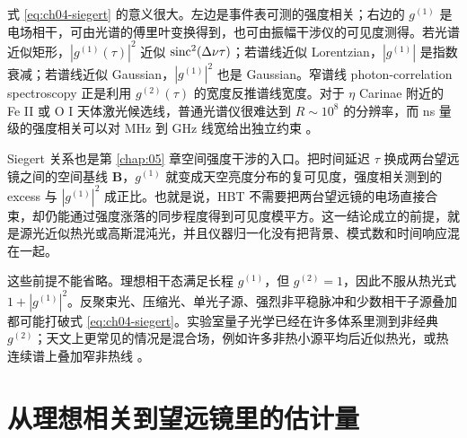 式 \eqref{eq:ch04-siegert} 的意义很大。左边是事件表可测的强度相关；右边的 \(g^{(1)}\) 是电场相干，可由光谱的傅里叶变换得到，也可由振幅干涉仪的可见度测得。若光谱近似矩形，\(|g^{(1)}(\tau)|^2\) 近似 \({\rm sinc}^2(\Delta\nu\tau)\)；若谱线近似 Lorentzian，\(|g^{(1)}|\) 是指数衰减；若谱线近似 Gaussian，\(|g^{(1)}|^2\) 也是 Gaussian。窄谱线 photon-correlation spectroscopy 正是利用 \(g^{(2)}(\tau)\) 的宽度反推谱线宽度。对于 \(\eta\) Carinae 附近的 Fe II 或 O I 天体激光候选线，普通光谱仪很难达到 \(R\sim10^8\) 的分辨率，而 ns 量级的强度相关可以对 MHz 到 GHz 线宽给出独立约束 \citep{2005NewA...10..361J,2008AIPC..984..216D,2014ApJ...789L..10T}。

Siegert 关系也是第 \ref{chap:05} 章空间强度干涉的入口。把时间延迟 \(\tau\) 换成两台望远镜之间的空间基线 \(\mathbf{B}\)，\(g^{(1)}\) 就变成天空亮度分布的复可见度，强度相关测到的 excess 与 \(|g^{(1)}|^2\) 成正比。也就是说，HBT 不需要把两台望远镜的电场直接合束，却仍能通过强度涨落的同步程度得到可见度模平方。这一结论成立的前提，就是源光近似热光或高斯混沌光，并且仪器归一化没有把背景、模式数和时间响应混在一起。

这些前提不能省略。理想相干态满足长程 \(g^{(1)}\)，但 \(g^{(2)}=1\)，因此不服从热光式 \(1+|g^{(1)}|^2\)。反聚束光、压缩光、单光子源、强烈非平稳脉冲和少数相干子源叠加都可能打破式 \eqref{eq:ch04-siegert}。实验室量子光学已经在许多体系里测到非经典 \(g^{(2)}\)；天文上更常见的情况是混合场，例如许多非热小源平均后近似热光，或热连续谱上叠加窄非热线 \citep{1965PhRv..140..676T,1977PhRvL..39..691K,1979OptL....4..205M,2000PhRvA..62d3816S,2008PhRvA..78f1802S,2012PhRvL.109n7404Z,2020MNRAS.491.5789L}。

\section{从理想相关到望远镜里的估计量}

